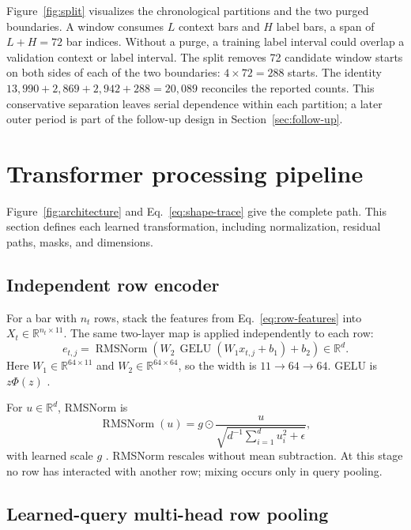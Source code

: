 \documentclass[10pt]{article}
\newcommand{\R}{\mathbb{R}}
\newcommand{\RMSNorm}{\operatorname{RMSNorm}}
\begin{document}
Figure~\ref{fig:split} visualizes the chronological partitions and the two purged boundaries.
A window consumes $L$ context bars and $H$ label bars, a span of $L+H=72$ bar indices. Without a
purge, a training label interval could overlap a validation context or label interval. The split
removes 72 candidate window starts on both sides of each of the two boundaries: $4\times72=288$
starts. The identity $13{,}990+2{,}869+2{,}942+288=20{,}089$ reconciles the reported counts. This
conservative separation leaves serial dependence within each partition; a later outer period is part
of the follow-up design in Section~\ref{sec:follow-up}.

\section{Transformer processing pipeline}

Figure~\ref{fig:architecture} and Eq.~\eqref{eq:shape-trace} give the complete path. This section
defines each learned transformation, including normalization, residual paths, masks, and dimensions.

\subsection{Independent row encoder}

For a bar with $n_t$ rows, stack the features from Eq.~\eqref{eq:row-features} into
$X_t\in\R^{n_t\times11}$. The same two-layer map is applied independently to each row:
\begin{equation}
e_{t,j}=\RMSNorm\!\left(W_2\,\operatorname{GELU}(W_1x_{t,j}+b_1)+b_2\right)
\in\R^d.
\label{eq:row-mlp}
\end{equation}
Here $W_1\in\R^{64\times11}$ and $W_2\in\R^{64\times64}$, so the width is
$11\rightarrow64\rightarrow64$. GELU is $z\Phi(z)$ \citep{hendrycks2016gelu}.

For $u\in\R^d$, RMSNorm is
\begin{equation}
\RMSNorm(u)=g\odot\frac{u}{\sqrt{d^{-1}\sum_{i=1}^d u_i^2+\epsilon}},
\label{eq:rmsnorm}
\end{equation}
with learned scale $g$ \citep{zhang2019rmsnorm}. RMSNorm rescales without mean subtraction. At this
stage no row has interacted with another row; mixing occurs only in query pooling.

\subsection{Learned-query multi-head row pooling}
\end{document}
